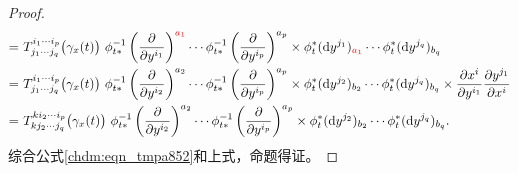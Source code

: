 \begin{proof}
\begin{equation*}
\begin{aligned}
        =& \ T^{i_1 \cdots i_p}_{j_1\cdots j_q}\bigl(\gamma_x(t)\bigr) \ 
        \phi_{t*} ^{-1}  \left(\frac{\partial }{\partial y^{i_1}}\right)^{\color{red} a_1} \cdots 
        \phi_{t*} ^{-1} \left(\frac{\partial }{\partial y^{i_p}}\right)^{a_p} 
         \times \phi_{t}^{*}({\rm d}y^{j_1})_{\color{red} a_1} \cdots \phi_{t}^{*} ({\rm d}y^{j_q})_{b_q}  \\
         =& \ T^{i_1 \cdots i_p}_{j_1\cdots j_q}\bigl(\gamma_x(t)\bigr) \ 
        \phi_{t*} ^{-1}  \left(\frac{\partial }{\partial y^{i_2}}\right)^{ a_2} \cdots 
        \phi_{t*} ^{-1} \left(\frac{\partial }{\partial y^{i_p}}\right)^{a_p} 
         \times \phi_{t}^{*}({\rm d}y^{j_2})_{b_2} \cdots \phi_{t}^{*} ({\rm d}y^{j_q})_{b_q}  
        \times \frac{\partial x^i}{\partial y^{i_1} }
        \frac{{\partial {y^{j_1} }}}{{\partial {x^i}}}  \\
        =& \ T^{k i_2 \cdots i_p}_{k j_2\cdots j_q}\bigl(\gamma_x(t)\bigr) \ 
        \phi_{t*} ^{-1}  \left(\frac{\partial }{\partial y^{i_2}}\right)^{ a_2} \cdots 
        \phi_{t*} ^{-1} \left(\frac{\partial }{\partial y^{i_p}}\right)^{a_p} 
         \times \phi_{t}^{*}({\rm d}y^{j_2})_{b_2} \cdots \phi_{t}^{*} ({\rm d}y^{j_q})_{b_q}  .
    \end{aligned}
\end{equation*}
综合公式\eqref{chdm:eqn_tmpa852}和上式，命题得证。
\end{proof}


